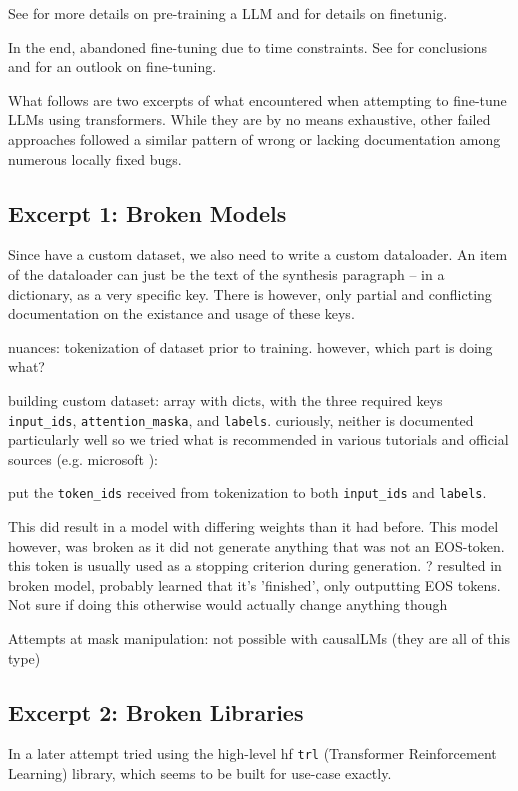 See  for more details on pre-training a \gls{LLM} and  for details on finetunig.

In the end,  abandoned fine-tuning due to time constraints. See  for conclusions and  for an outlook on fine-tuning.

What follows are two excerpts of what  encountered when attempting to fine-tune \glspl{LLM} using \gls{transformers}.
While they are by no means exhaustive, other failed approaches followed a similar pattern of wrong or lacking documentation among numerous locally fixed bugs.

\subsection{Excerpt 1: Broken Models}\label{sub:brokenft}
Since  have a custom dataset, we also need to write a custom dataloader.
An item of the dataloader can just be the text of the synthesis paragraph -- in a dictionary, as a very specific key.
There is however, only partial and conflicting documentation on the existance and usage of these keys.

{
\color{blue}
nuances: tokenization of dataset prior to training. however, which part is doing what?

building custom dataset: array with dicts, with the three required keys \verb`input_ids`, \verb`attention_maska`, and \verb`labels`. curiously, neither is documented particularly well so we tried what is recommended in various tutorials and official sources (e.g. microsoft \cite{deepspeedexamples_2023}):

put the \verb`token_ids` received from tokenization to both \verb`input_ids` and \verb`labels`.

This did result in a model with differing weights than it had before. This model however, was broken as it did not generate anything that was not an EOS-token.
this token is usually used as a stopping criterion during generation.
? resulted in broken model, probably learned that it's 'finished', only outputting EOS tokens. Not sure if doing this otherwise would actually change anything though

Attempts at mask manipulation: not possible with causalLMs (they are all of this type)
}

\subsection{Excerpt 2: Broken Libraries}\label{sub:libraries}
In a later attempt  tried using the high-level \gls{hf} \verb`trl` (Transformer Reinforcement Learning) library, which seems to be built for  use-case exactly.

